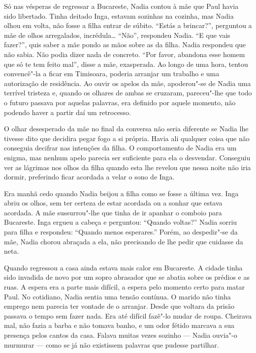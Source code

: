 Só nas vésperas de regressar a Bucareste, Nadia contou à mãe que Paul
havia sido libertado. Tinha deitado Inga, estavam sozinhas na cozinha,
mas Nadia olhou em volta, não fosse a filha entrar de súbito. ``Estás a
brincar?'', perguntou a mãe de olhos arregalados, incrédula\ldots{}
``Não'', respondeu Nadia. ``E que vais fazer?'', quis saber a mãe pondo as
mãos sobre as da filha. Nadia respondeu que não sabia. Não podia dizer
nada de concreto. ``Por favor, abandona esse homem que só te tem feito
mal'', disse a mãe, exasperada. Ao longo de uma hora, tentou convencê"-la
a ficar em Timisoara, poderia arranjar um trabalho e uma autorização de
residência. Ao ouvir os apelos da mãe, apoderou"-se de Nadia uma terrível
tristeza e, quando os olhares de ambas se cruzaram, pareceu"-lhe que todo
o futuro passava por aquelas palavras, era definido por aquele momento,
não podendo haver a partir daí um retrocesso.

O olhar desesperado da mãe no final da conversa não
seria diferente se Nadia lhe tivesse dito que decidira pegar
fogo a si própria. Havia ali qualquer coisa que não conseguia decifrar
nas intenções da filha. O comportamento de Nadia era um enigma, mas
nenhum apelo parecia ser suficiente para ela o desvendar. Conseguiu ver
as lágrimas nos olhos da filha quando esta lhe revelou que nessa noite
não iria dormir, preferindo ficar acordada a velar o sono de Inga.

Era manhã cedo quando Nadia beijou a filha como se fosse a última vez.
Inga abriu os olhos, sem ter certeza de estar acordada ou a sonhar que
estava acordada. A mãe sussurrou"-lhe que tinha de ir apanhar o comboio
para Bucareste. Inga ergueu a cabeça e perguntou: ``Quando voltas?'' Nadia
sorriu para filha e respondeu: ``Quando menos esperares.'' Porém, ao
despedir"-se da mãe, Nadia chorou abraçada a ela, não precisando de lhe
pedir que cuidasse da neta.

\bigskip

Quando regressou a casa ainda estava mais calor em Bucareste. A cidade
tinha sido invadida de novo por um sopro abrasador que se abatia sobre
os prédios e as ruas. A espera era a parte mais difícil, a espera pelo
momento certo para matar Paul. No cotidiano, Nadia sentia uma tensão
contínua. O marido não tinha emprego nem parecia ter vontade de o
arranjar. Desde que voltara da prisão passava o tempo sem fazer nada.
Era até difícil fazê"-lo mudar de roupa. Cheirava mal, não fazia a barba
e não tomava banho, e um odor fétido marcava a sua presença pelos cantos
da casa. Falava muitas vezes sozinho --- Nadia ouvia"-o murmurar --- como
se já não existissem palavras que pudesse partilhar.

